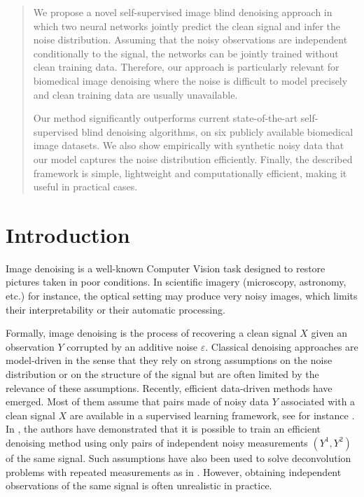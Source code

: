 \documentclass{article}
\begin{document}
\printAffiliationsAndNotice{}  %


\begin{abstract}
We propose a novel self-supervised image blind denoising approach in which two neural networks jointly predict the clean signal and infer the noise distribution.
Assuming that the noisy observations are independent conditionally to the signal, the networks can be jointly trained without clean training data. Therefore, our approach is particularly relevant for biomedical image denoising where the noise is difficult to model precisely and clean training data are usually unavailable.

Our method significantly outperforms current state-of-the-art self-supervised blind denoising algorithms, on six publicly available biomedical image datasets. We also show empirically with synthetic noisy data that our model captures the noise distribution efficiently. Finally, the described framework is simple, lightweight and computationally efficient, making it useful in practical cases.
\end{abstract}

\section{Introduction}
\label{sec:introduction}

Image denoising is a well-known Computer Vision task designed to restore pictures taken in poor conditions. In scientific imagery (microscopy, astronomy, etc.) for instance,  the optical setting may produce very noisy images, which limits their interpretability or their automatic processing.

Formally, image denoising is the process of recovering a clean signal $X$ given an observation $Y$ corrupted by an additive noise $\varepsilon$. Classical denoising approaches are model-driven in the sense that they rely on strong assumptions on the noise distribution or on the structure of the signal but are often limited by the relevance of these assumptions.
Recently, efficient data-driven methods have emerged. Most of them assume that pairs made of noisy data $Y$ associated with a clean signal $X$ are available in a supervised learning framework, see for instance \cite{weigert2017content}. In \cite{lehtinen2018noise2noise}, the authors have demonstrated that it is possible to train an efficient denoising method using only pairs of independent noisy measurements $(Y^1, Y^2)$ of the same signal. Such assumptions have also been used to solve deconvolution problems with repeated measurements as in \cite{delaigle2008deconvolution}. However, obtaining independent observations of the same signal is often unrealistic in practice.
\end{document}
